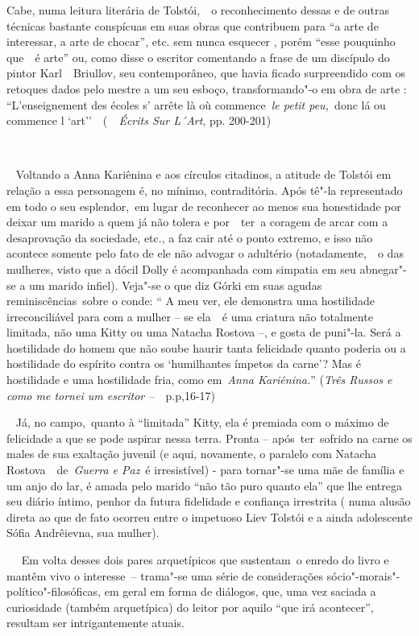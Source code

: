 Cabe, numa leitura literária de Tolstói,~~o reconhecimento dessas e de
outras técnicas bastante conspícuas em suas obras que contribuem para
``a arte de interessar, a arte de chocar'', etc. sem nunca esquecer ,
porém ``esse pouquinho que~~é arte'' ou, como disse o escritor
comentando a frase de um discípulo do pintor Karl~~Briullov, seu
contemporâneo, que havia ficado surpreendido com os retoques dados pelo
mestre a um seu esboço, transformando"-o em obra de arte :
``L'enseignement des écoles s' arrête là où commence~\emph{le petit
peu,~}donc lá ou commence l `art''~~(~\emph{~Écrits Sur L´Art}, pp.
200-201)

~

~ Voltando a Anna Kariênina e aos círculos citadinos, a atitude de
Tolstói em relação a essa personagem é, no mínimo, contraditória. Após
tê"-la representado em todo o seu esplendor,~em lugar de reconhecer ao
menos sua honestidade por deixar um marido a quem já não tolera e
por~~ter~a coragem de arcar com a desaprovação da sociedade, etc., a faz
cair até o ponto extremo, e isso não acontece somente pelo fato de ele
não advogar o adultério (notadamente,~~o das mulheres, visto que a dócil
Dolly é acompanhada com simpatia em seu abnegar"-se a um marido infiel).
Veja"-se o que diz Górki em suas agudas reminiscências~sobre o conde: ``
A meu ver, ele demonstra uma hostilidade irreconciliável para com a
mulher -- se ela~~é uma criatura não totalmente limitada, não uma Kitty
ou uma Natacha Rostova --, e gosta de puni"-la. Será a hostilidade do
homem que não soube haurir tanta felicidade quanto poderia ou a
hostilidade do espírito contra os `humilhantes ímpetos da carne'? Mas é
hostilidade e uma hostilidade fria, como em~\emph{Anna Kariênina.}''
(\emph{Três Russos e como me tornei um escritor --~}~p.p,16-17)

\emph{~} Já, no campo,~quanto à ``limitada'' Kitty, ela é premiada com o
máximo de felicidade a que se pode aspirar nessa terra. Pronta --
após~ter~sofrido na carne os males de sua exaltação juvenil (e aqui,
novamente, o paralelo com Natacha Rostova~~de~\emph{Guerra e Paz}~é
irresistível) - para tornar"-se uma mãe de família e um anjo do lar, é
amada pelo marido ``não tão puro quanto ela'' que lhe entrega seu diário
íntimo, penhor da futura fidelidade e confiança irrestrita ( numa alusão
direta ao que de fato ocorreu entre o impetuoso Liev Tolstói e a ainda
adolescente Sófia Andrêievna, sua mulher).

~~ Em volta desses dois pares arquetípicos que sustentam~o enredo do
livro e mantêm vivo o interesse~-- trama"-se uma série de considerações
sócio"-morais"-político"-filosóficas, em geral em forma de diálogos, que,
uma vez saciada a curiosidade (também arquetípica) do leitor por aquilo
``que irá acontecer'', resultam ser intrigantemente atuais.

